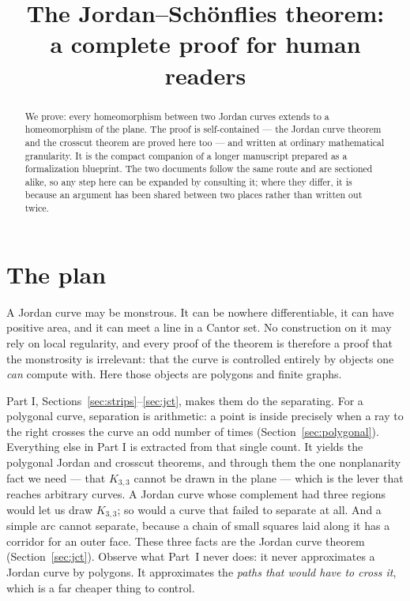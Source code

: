 \documentclass[11pt,a4paper]{article}
\title{The Jordan--Schönflies theorem:\\ a complete proof for human readers}
\author{}
\date{}
\theoremstyle{jsplain}
\theoremstyle{jsdefn}
\begin{document}
\maketitle

\begin{abstract}
We prove: every homeomorphism between two Jordan curves extends to a
homeomorphism of the plane. The proof is self-contained --- the Jordan
curve theorem and the crosscut theorem are proved here too --- and
written at ordinary mathematical granularity. It is the
compact companion of a longer manuscript prepared as a formalization
blueprint. The two documents follow the same route and are sectioned
alike, so any step here can be expanded by consulting it; where they
differ, it is because an argument has been shared between two places
rather than written out twice.
\end{abstract}

\section*{The plan}

A Jordan curve may be monstrous. It can be nowhere differentiable, it
can have positive area, and it can meet a line in a Cantor set. No
construction on it may rely on local regularity, and every proof of the
theorem is therefore a proof that the monstrosity is irrelevant: that
the curve is controlled entirely by objects one \emph{can} compute
with. Here those
objects are polygons and finite graphs.

Part I, Sections~\ref{sec:strips}--\ref{sec:jct}, makes them do the
separating. For a polygonal curve, separation is arithmetic: a point is
inside precisely when a ray to the right crosses the curve an odd number
of times (Section~\ref{sec:polygonal}). Everything else in Part I is
extracted from that single count. It yields the polygonal Jordan and
crosscut theorems, and through them the one nonplanarity fact we need
--- that $K_{3,3}$ cannot be drawn in the plane --- which is the lever
that reaches arbitrary curves. A Jordan curve whose complement had three
regions would let us draw $K_{3,3}$; so would a curve that failed to
separate at all. And a simple arc cannot separate, because a chain of
small squares laid along it has a corridor for an outer face. These
three facts are the Jordan curve theorem
(Section~\ref{sec:jct}). Observe what Part~I never does: it never
approximates a Jordan curve by polygons. It approximates the
\emph{paths that would have to cross it}, which is a far cheaper thing
to control.
\end{document}
